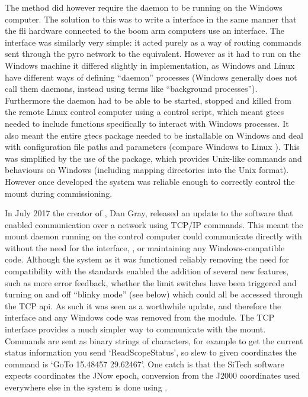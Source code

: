 \begin{colsection}
\begin{colsection}
The  method did however require the  daemon to be running on the Windows computer. The solution to this was to write a  interface in the same manner that the \gls{fli} hardware connected to the boom arm computers use an  interface. The  interface was similarly very simple: it acted purely as a way of routing commands sent through the \gls{pyro} network to the  equivalent. However as it had to run on the Windows machine it differed slightly in implementation, as Windows and Linux have different ways of defining ``daemon'' processes (Windows generally does not call them daemons, instead using terms like ``background processes''). Furthermore the daemon had to be able to be started, stopped and killed from the remote Linux control computer using a  control script, which meant \gls{gtecs} needed to include functions specifically to interact with Windows processes. It also meant the entire \gls{gtecs} package needed to be installable on Windows and deal with configuration file paths and parameters (compare Windows  to Linux ). This was simplified by the use of the  package, which provides Unix-like commands and behaviours on Windows (including mapping directories into the Unix format). However once developed the system was reliable enough to correctly control the mount during commissioning.

In July 2017 the creator of , Dan Gray, released an update to the software that enabled communication over a network using TCP/IP commands. This meant the mount daemon running on the control computer could communicate directly with  without the need for the interface, ,  or maintaining any Windows-compatible code. Although the system as it was functioned reliably removing the need for compatibility with the  standards enabled the addition of several new features, such as more error feedback, whether the limit switches have been triggered and turning on and off ``blinky mode'' (see below) which could all be accessed through the TCP \gls{api}. As such it was seen as a worthwhile update, and therefore the  interface and any Windows code was removed from the  module. The TCP interface provides a much simpler way to communicate with the mount. Commands are sent as binary strings of characters, for example to get the current status information you send `ReadScopeStatus', so slew to given coordinates the command is `GoTo 15.48457 29.62467'. One catch is that the SiTech software expects coordinates the JNow epoch, conversion from the J2000 coordinates used everywhere else in the system is done using .


\end{colsection}
\end{colsection}
